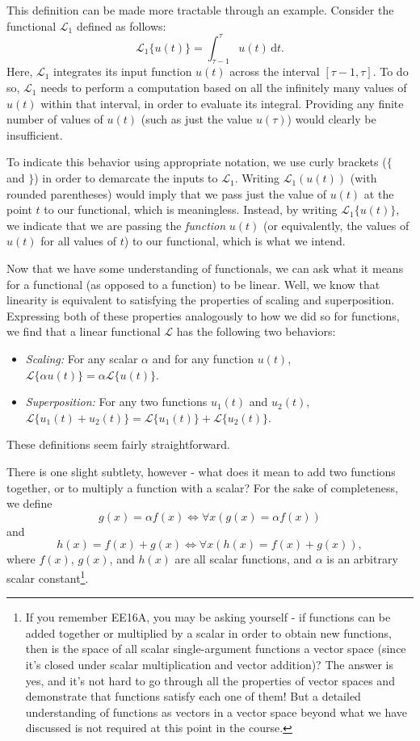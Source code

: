 \documentclass[letterpaper]{article}
\theoremstyle{remark}
\newcommand{\dt}{\mathrm{d}t}
\begin{document}
This definition can be made more tractable through an example. Consider the functional $\mathcal{L}_1$ defined as follows:
\[
    \mathcal{L}_1\{u(t)\} = \int_{\tau - 1}^{\tau} u(t) \, \dt.
\]
Here, $\mathcal{L}_1$ integrates its input function $u(t)$ across the interval $[\tau - 1, \tau]$. To do so, $\mathcal{L}_1$ needs to perform a computation based on all the infinitely many values of $u(t)$ within that interval, in order to evaluate its integral. Providing any finite number of values of $u(t)$ (such as just the value $u(\tau)$) would clearly be insufficient. 

To indicate this behavior using appropriate notation, we use curly brackets ($\{$ and $\}$) in order to demarcate the inputs to $\mathcal{L}_1$. Writing $\mathcal{L}_1(u(t))$ (with rounded parentheses) would imply that we pass just the value of $u(t)$ at the point $t$ to our functional, which is meaningless. Instead, by writing $\mathcal{L}_1\{u(t)\}$, we indicate that we are passing the \emph{function} $u(t)$ (or equivalently, the values of $u(t)$ for all values of $t$) to our functional, which is what we intend.

Now that we have some understanding of functionals, we can ask what it means for a functional (as opposed to a function) to be linear. Well, we know that linearity is equivalent to satisfying the properties of scaling and superposition. Expressing both of these properties analogously to how we did so for functions, we find that a linear functional $\mathcal{L}$ has the following two behaviors:
\begin{itemize}
    \item \emph{Scaling:} For any scalar $\alpha$ and for any function $u(t)$, $\mathcal{L}\{\alpha u(t)\} = \alpha \mathcal{L}\{u(t)\}$.
    \item \emph{Superposition:} For any two functions $u_1(t)$ and $u_2(t)$, $\mathcal{L}\{u_1(t) + u_2(t)\} = \mathcal{L}\{u_1(t)\} + \mathcal{L}\{u_2(t)\}$.
\end{itemize}
These definitions seem fairly straightforward. 

There is one slight subtlety, however - what does it mean to add two functions together, or to multiply a function with a scalar? For the sake of completeness, we define
\[
    g(x) = \alpha f(x) \iff \forall{x}(g(x) = \alpha f(x))
\]
and
\[
    h(x) = f(x) + g(x) \iff \forall{x}(h(x) = f(x) + g(x)),
\]
where $f(x)$, $g(x)$, and $h(x)$ are all scalar functions, and $\alpha$ is an arbitrary scalar constant\footnote{If you remember EE16A, you may be asking yourself - if functions can be added together or multiplied by a scalar in order to obtain new functions, then is the space of all scalar single-argument functions a vector space (since it's closed under scalar multiplication and vector addition)? The answer is yes, and it's not hard to go through all the properties of vector spaces and demonstrate that functions satisfy each one of them! But a detailed understanding of functions as vectors in a vector space beyond what we have discussed is not required at this point in the course.}.
\end{document}
